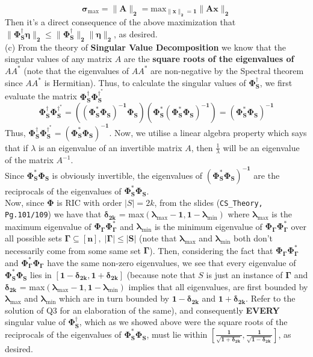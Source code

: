 \documentclass[a4paper,11pt]{article}
\numberwithin{definition}{section}
\numberwithin{mytheorem}{subsection}
\begin{document}
$$\boldsymbol{\sigma_{\mathrm{max}} = \lVert A\rVert_2 = \mathrm{max}_{\lVert x\rVert_2 = 1}\lVert Ax\rVert_2}$$
Then it's a direct consequence of the above maximization that $\boldsymbol{\lVert\Phi_S^{\dagger}\eta\rVert_2 \leq \lVert\Phi_S^{\dagger}\rVert_2\lVert\eta\rVert_2}$, as desired.
\\
(c) From the theory of \textbf{Singular Value Decomposition} we know that the singular values of any matrix $A$ are the \textbf{square roots of the eigenvalues of $AA^*$} (note that the eigenvalues of $AA^*$ are non-negative by the Spectral theorem since $AA^*$ is Hermitian). Thus, to calculate the singular values of $\boldsymbol{\Phi_S^{\dagger}}$, we first evaluate the matrix $\boldsymbol{\Phi_S^{\dagger}}\boldsymbol{\Phi_S^{\dagger^{*}}}$ 
$$\boldsymbol{\Phi_S^{\dagger}\Phi_S^{\dagger^{*}} = ((\Phi_S^*\Phi_S)^{-1}\Phi_S)(\Phi_S^*(\Phi_S^*\Phi_S)^{-1}) = (\Phi_S^*\Phi_S)^{-1}}$$
Thus, $\boldsymbol{\Phi_S^{\dagger}\Phi_S^{\dagger^{*}} = (\Phi_S^*\Phi_S)^{-1}}$. Now, we utilise a linear algebra property which says that if $\lambda$ is an eigenvalue of an invertible matrix $A$, then $\frac{1}{\lambda}$ will be an eigenvalue of the matrix $A^{-1}$. \\
Since $\boldsymbol{\Phi_S^*\Phi_S}$ is obviously invertible, the eigenvalues of $\boldsymbol{(\Phi_S^*\Phi_S)^{-1}}$ are the reciprocals of the eigenvalues of $\boldsymbol{\Phi_S^*\Phi_S}$.\\
Now, since $\boldsymbol{\Phi}$ is RIC with order $|S| = 2k$, from the slides (\texttt{CS\_Theory, Pg.101/109}) we have that $\boldsymbol{\delta_{2k}}$ = max$\boldsymbol{(\lambda_{\mathrm{max}}-1, 1-\lambda_{\mathrm{min}})}$ where $\boldsymbol{\lambda_{\mathrm{max}}}$ is the maximum eigenvalue of $\boldsymbol{\Phi_{\Gamma}\Phi_{\Gamma}^*}$ and $\boldsymbol{\lambda_{\mathrm{min}}}$ is the minimum eigenvalue of $\boldsymbol{\Phi_{\Gamma}\Phi_{\Gamma}^*}$ over all possible sets $\boldsymbol{\Gamma\subseteq[n],\;|\Gamma| \leq |S|}$ (note that $\boldsymbol{\lambda_{\mathrm{max}}}$ and $\boldsymbol{\lambda_{\mathrm{min}}}$ both don't necessarily come from some same set $\boldsymbol{\Gamma}$). Then, considering the fact that $\boldsymbol{\Phi_{\Gamma}\Phi_{\Gamma}^*}$ and $\boldsymbol{\Phi_{\Gamma}^*\Phi_{\Gamma}}$ have the same non-zero eigenvalues, we see that every eigenvalue of $\boldsymbol{\Phi_S^*\Phi_S}$ lies in $\boldsymbol{[1-\delta_{2k}, 1+\delta_{2k}]}$ (because note that $S$ is just an instance of $\boldsymbol{\Gamma}$ and  $\boldsymbol{\delta_{2k}}$ = max$\boldsymbol{(\lambda_{\mathrm{max}}-1, 1-\lambda_{\mathrm{min}})}$ implies that all eigenvalues, are first bounded by $\boldsymbol{\lambda_{\mathrm{max}}}$ and $\boldsymbol{\lambda_{\mathrm{min}}}$ which are in turn bounded by $\boldsymbol{1-\delta_{2k}}$ and $\boldsymbol{1+\delta_{2k}}$. Refer to the solution of Q3 for an elaboration of the same), and consequently \textbf{EVERY} singular value of $\boldsymbol{\Phi_S^{\dagger}}$, which as we showed above were the square roots of the reciprocals of the eigenvalues of $\boldsymbol{\Phi_S^*\Phi_S}$, must lie within $\boldsymbol{[\frac{1}{\sqrt{1+\delta_{2k}}}, \frac{1}{\sqrt{1-\delta_{2k}}}]}$, as desired.
\end{document}
